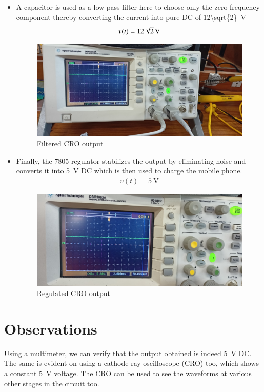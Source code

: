 \documentclass[journal,12pt,twocolumn]{IEEEtran}
\numberwithin{equation}{section}
\numberwithin{figure}{section}
\begin{document}
\begin{itemize}
	\item A capacitor is used as a low-pass filter here to choose only the zero frequency component thereby converting the current into pure DC of \SI[parse-numbers=false]{12\sqrt{2}}{\volt}
	\begin{align}
		v(t) = \SI[parse-numbers=false]{12\sqrt{2}}{\volt}
	\end{align}
	\begin{figure}[!ht]
		\centering
		\includegraphics[width=\columnwidth]{./figs/filter.jpg}
		\caption{Filtered CRO output}
		\label{fig-filter}	
	\end{figure}
	
	\item Finally, the 7805 regulator stabilizes the output by eliminating noise and converts it into \SI{5}{\volt} DC which is then used to charge the mobile phone.
	\begin{align}
		v(t) = \SI{5}{\volt}
	\end{align}
	\begin{figure}[!ht]
		\centering
		\includegraphics[width=\columnwidth]{./figs/regulator.jpg}
		\caption{Regulated CRO output}
		\label{fig-regulator}	
	\end{figure}
	\end{itemize}
	
	\section{Observations}
	Using a multimeter, we can verify that the output obtained is indeed \SI{5}{\volt} DC. The same is evident on using a cathode-ray oscilloscope (CRO) too, which shows a constant \SI{5}{\volt} voltage. The CRO can be used to see the waveforms at various other stages in the circuit too.
	
\end{document}
